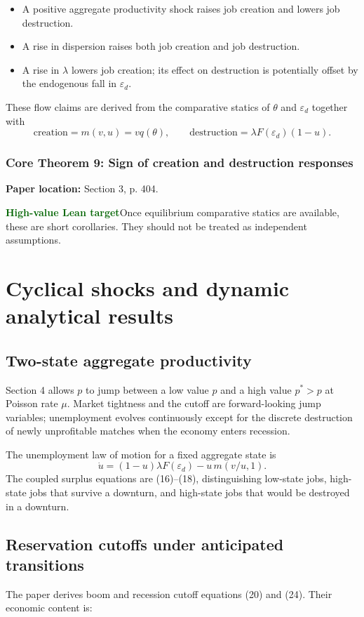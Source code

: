 \documentclass[11pt]{article}
\newcommand{\leanhigh}{\textcolor{darkgreen}{\textbf{High-value Lean target}}}
\newcommand{\papersec}[1]{\textbf{Paper location:} #1}
\newcommand{\statusbox}[2]{\colorbox{#1}{\parbox{0.94\linewidth}{#2}}}
\newcommand{\epsd}{\varepsilon_d}
\begin{document}
\begin{itemize}
\item A positive aggregate productivity shock raises job creation and lowers job destruction.
\item A rise in dispersion raises both job creation and job destruction.
\item A rise in $\lambda$ lowers job creation; its effect on destruction is potentially offset by the endogenous fall in $\epsd$.
\end{itemize}

These flow claims are derived from the comparative statics of $\theta$ and $\epsd$ together with
\[
\text{creation}=m(v,u)=vq(\theta),
\qquad
\text{destruction}=\lambda F(\epsd)(1-u).
\]

\subsubsection*{Core Theorem 9: Sign of creation and destruction responses}
\papersec{Section 3, p. 404.}

\statusbox{softgreen}{\leanhigh\quad Once equilibrium comparative statics are available, these are short corollaries. They should not be treated as independent assumptions.}

\section{Cyclical shocks and dynamic analytical results}

\subsection{Two-state aggregate productivity}
Section 4 allows $p$ to jump between a low value $p$ and a high value $p^*>p$ at Poisson rate $\mu$. Market tightness and the cutoff are forward-looking jump variables; unemployment evolves continuously except for the discrete destruction of newly unprofitable matches when the economy enters recession.

The unemployment law of motion for a fixed aggregate state is
\begin{equation}
\dot u=(1-u)\lambda F(\epsd)-u\,m(v/u,1). \tag{15}
\end{equation}
The coupled surplus equations are (16)--(18), distinguishing low-state jobs, high-state jobs that survive a downturn, and high-state jobs that would be destroyed in a downturn.

\subsection{Reservation cutoffs under anticipated transitions}
The paper derives boom and recession cutoff equations (20) and (24). Their economic content is:
\end{document}
